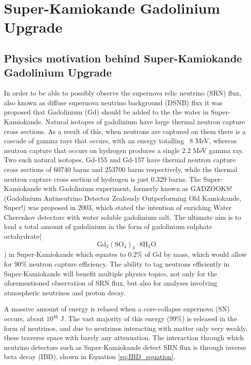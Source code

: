 \chapter{Super-Kamiokande Gadolinium Upgrade}\label{chp:superkgdupgrade}


\section{Physics motivation behind Super-Kamiokande Gadolinium Upgrade}

In order to be able to possibly observe the supernova relic neutrino (SRN) flux, also known as diffuse supernova neutrino background (DSNB) flux it was proposed that Gadolinium (Gd) should be added to the the water in Super-Kamiokande. Natural isotopes of gadolinium have large thermal neutron capture cross sections. As a result of this, when neutrons are captured on them there is a cascade of gamma rays that occurs, with an energy totalling ~8 MeV, whereas neutron capture that occurs on hydrogen produces a single 2.2 MeV gamma ray. Two such natural isotopes, Gd-155 and Gd-157 have thermal neutron capture cross sections of 60740 barns and 253700 barns respectively, while the thermal neutron capture cross section of hydrogen is just 0.329 barns. The Super-Kamiokande with Gadolinium experiment, formerly known as GADZOOKS! (Gadolinium Antineutrino Detector Zealously Outperforming Old Kamiokande, Super!) was proposed in 2003, which stated the intention of enriching Water Cherenkov detectors with water soluble gadolinium salt. The ultimate aim is to load a total amount of gadolinium in the form of gadolinium sulphate octahydrate($$
\mathrm{Gd}_{2}\left(\mathrm{SO}_{4}\right)_{3} \cdot 8 \mathrm{H}_{2} \mathrm{O}$$) in Super-Kamiokande which equates to 0.2\% of Gd by mass, which would allow for 90\% neutron capture efficiency. The ability to tag neutrons efficiently in Super-Kamiokande will benefit multiple physics topics, not only for the aforementioned observation of SRN flux, but also for analyses involving atmospheric neutrinos and proton decay. 
\newline

A massive amount of energy is relased when a core-collapse supernova (SN) occurs, about $10^{46}$ J. The vast majority of this energy (99\%) is released in the form of neutrinos, and due to neutrinos interacting with matter only very weakly, these traverse space with barely any attenuation. The interaction through which neutrino detectors such as Super-Kamiokande detect SRN flux is through inverse beta decay (IBD), shown in Equation \ref{eq:IBD_equation}. 

